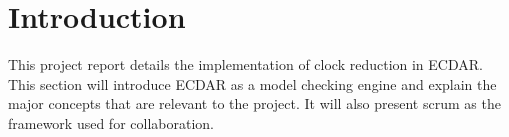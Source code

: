 \chapter{Introduction}
This project report details the implementation of clock reduction in ECDAR. This section will introduce ECDAR as a model checking engine and explain the major concepts that are relevant to the project. It will also present scrum as the framework used for collaboration.



















